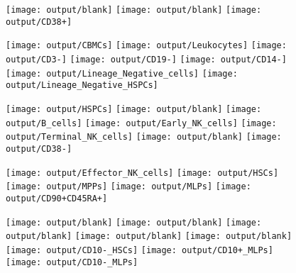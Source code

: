 \documentclass[11pt]{article}
\begin{document}
\begin{figure}[htbp]
\begin{minipage}[t]{0.125\textwidth}
    \texttt{[image: output/blank]}
    \texttt{[image: output/blank]}
    \texttt{[image: output/CD38+]}
  \end{minipage}%
  \begin{minipage}[t]{0.125\textwidth}
    \centering
    \texttt{[image: output/CBMCs]}
    \texttt{[image: output/Leukocytes]}
    \texttt{[image: output/CD3-]}
    \texttt{[image: output/CD19-]}
    \texttt{[image: output/CD14-]}
    \texttt{[image: output/Lineage\_Negative\_cells]}
    \texttt{[image: output/Lineage\_Negative\_HSPCs]}
  \end{minipage}%
  \begin{minipage}[t]{0.125\textwidth}
    \centering
    \vspace{-0.5\linewidth} %
    \texttt{[image: output/HSPCs]}
    \texttt{[image: output/blank]}
    \texttt{[image: output/B\_cells]}
    \texttt{[image: output/Early\_NK\_cells]}
    \texttt{[image: output/Terminal\_NK\_cells]}
    \texttt{[image: output/blank]}
    \texttt{[image: output/CD38-]}
  \end{minipage}%
  \begin{minipage}[t]{0.125\textwidth}
    \centering
    \vspace{4\linewidth} %
    \texttt{[image: output/Effector\_NK\_cells]}
    \texttt{[image: output/HSCs]}
    \texttt{[image: output/MPPs]}
    \texttt{[image: output/MLPs]}
    \texttt{[image: output/CD90+CD45RA+]}
  \end{minipage}%
  \begin{minipage}[t]{0.125\textwidth}
    \centering
    \vspace{-0.5\linewidth} %
    \texttt{[image: output/blank]}
    \texttt{[image: output/blank]}
    \texttt{[image: output/blank]}
    \texttt{[image: output/blank]}
    \texttt{[image: output/blank]}
    \texttt{[image: output/CD10-\_HSCs]}
    \texttt{[image: output/CD10+\_MLPs]}
    \texttt{[image: output/CD10-\_MLPs]}
  \end{minipage}%
  \label{fig:figure}
\end{figure}
\end{document}
